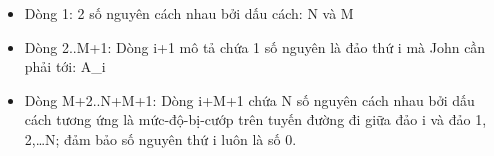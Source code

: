 \begin{itemize}
	\item     Dòng 1: 2 số nguyên cách nhau bởi dấu cách: N và M   
	\item     Dòng 2..M+1: Dòng i+1 mô tả chứa 1 số nguyên là đảo thứ i         mà John cần phải tới: A\_i   
	\item     Dòng M+2..N+M+1: Dòng i+M+1 chứa N số nguyên cách nhau bởi dấu cách         tương ứng là mức-độ-bị-cướp trên tuyến đường đi giữa đảo i và          đảo 1, 2,…N; đảm bảo số nguyên thứ i luôn là số 0.   
\end{itemize}

\